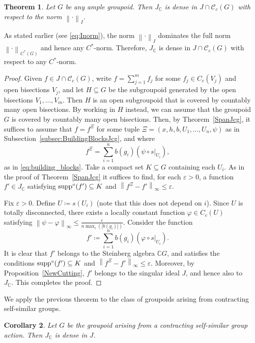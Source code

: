 \documentclass[11pt, oneside, reqno]{amsart}
\newcommand{\cg}{\mathscr{C}_c(G)}
\newcommand{\abs}[1]{\left\vert#1\right\vert}
\newcommand{\norm}[1]{\left\|#1\right\|}
\newcommand{\supp}{{\rm supp}}
\newcommand{\osupp}{\supp^{\circ}}
\newtheorem{thm}{Theorem}[section]
\newtheorem{cor}[thm]{Corollary}
\theoremstyle{definition}
\theoremstyle{remark}
\numberwithin{equation}{section}
\begin{document}
\begin{thm}\label{AlgSingId}
    Let $G$ be any ample groupoid. Then $J_{\mathbb{C}}$ is dense in $J \cap \cg$ with respect to the norm $\norm{\cdot}_I$.
\end{thm}

As stated earlier (see \eqref{eq:Inorm}), the norm $\norm{\cdot}_I$ dominates the full norm $\norm{\cdot}_{C^*(G)}$ and hence any $C^{*}$-norm. Therefore, $J_{\mathbb{C}}$ is dense in $J \cap \cg$ with respect to any $C^{*}$-norm.

\begin{proof}
    Given $f \in J \cap \cg$, write $f = \sum_{j=1}^m f_j$ for some $f_j \in C_c(V_j)$ and open bisections $V_j$, and let $H \subseteq G$ be the subgroupoid generated by the open bisections $V_1, \dots, V_m$. Then $H$ is an open subgroupoid that is covered by countably many open bisections. By working in $H$ instead, we can assume that the groupoid $G$ is covered by countably many open bisections. Then, by Theorem~\ref{SpanJcg}, it suffices to assume that $f = f^\Xi$ for some tuple $\Xi = (x, h, b, U_1, \dots, U_n, \psi)$ as in Subsection~\ref{subsec:BuildingBlocksJcg}, and where
    \[
    f^\Xi = \sum_{i=1}^n b(g_i) (\psi \circ s|_{U_i}),
    \]
    as in \eqref{eq:building_blocks}. Take a compact set $K \subseteq G$ containing each $U_i$. As in the proof of Theorem~\ref{SpanJcg} it suffices to find, for each $\varepsilon>0$, a function $f' \in J_{\mathbb{C}}$ satisfying $\osupp(f') \subseteq K$ and $\norm{f^\Xi-f'}_\infty \le \varepsilon$.
    
    Fix $\varepsilon>0$. Define $U \coloneq s(U_i)$ (note that this does not depend on $i$). Since $U$ is totally disconnected, there exists a locally constant function $\varphi \in C_c(U)$ satisfying $\norm{\psi - \varphi}_\infty \le \frac{\varepsilon}{n \max_i(\abs{b(g_i)})}$. Consider the function
    \[
    f' \coloneq \sum_{i=1}^n b(g_i) (\varphi \circ s|_{U_i}).
    \]
    It is clear that $f'$ belongs to the Steinberg algebra $\mathbb{C}G$, and satisfies the conditions $\osupp(f') \subseteq K$ and $\norm{f^\Xi-f'}_\infty \le \varepsilon$. Moreover, by Proposition~\ref{NewCutting}, $f'$ belongs to the singular ideal $J$, and hence also to $J_\mathbb{C}$. This completes the proof.
\end{proof}

We apply the previous theorem to the class of groupoids arising from contracting self-similar groups.

\begin{cor}\label{SelfSim}
    Let $G$ be the groupoid arising from a contracting self-similar group action. Then $J_\mathbb{C}$ is dense in $J$.
\end{cor}
\end{document}
